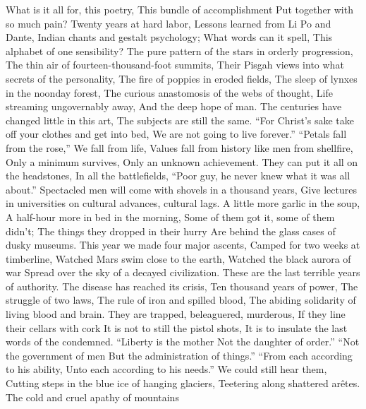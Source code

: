 \begin{poem}
    What is it all for, this poetry, 
    This bundle of accomplishment 
    Put together with so much pain? 
    Twenty years at hard labor, 
    Lessons learned from Li Po and Dante, 
    Indian chants and gestalt psychology; 
    What words can it spell, 
    This alphabet of one sensibility? 
    The pure pattern of the stars in orderly progression, 
    The thin air of fourteen-thousand-foot summits, 
    Their Pisgah views into what secrets of the personality, 
    The fire of poppies in eroded fields, 
    The sleep of lynxes in the noonday forest, 
    The curious anastomosis of the webs of thought, 
    Life streaming ungovernably away, 
    And the deep hope of man. 
    The centuries have changed little in this art, 
    The subjects are still the same. 
    ``For Christ's sake take off your clothes and get into bed, 
    We are not going to live forever.'' 
    ``Petals fall from the rose,'' 
    We fall from life, 
    Values fall from history like men from shellfire, 
    Only a minimum survives, 
    Only an unknown achievement. 
    They can put it all on the headstones, 
    In all the battlefields, 
    ``Poor guy, he never knew what it was all about.'' 
    Spectacled men will come with shovels in a thousand years, 
    Give lectures in universities on cultural advances, cultural lags. 
    A little more garlic in the soup, 
    A half-hour more in bed in the morning, 
    Some of them got it, some of them didn't; 
    The things they dropped in their hurry 
    Are behind the glass cases of dusky museums. 
    This year we made four major ascents, 
    Camped for two weeks at timberline, 
    Watched Mars swim close to the earth, 
    Watched the black aurora of war 
    Spread over the sky of a decayed civilization. 
    These are the last terrible years of authority. 
    The disease has reached its crisis, 
    Ten thousand years of power, 
    The struggle of two laws, 
    The rule of iron and spilled blood, 
    The abiding solidarity of living blood and brain. 
    They are trapped, beleaguered, murderous, 
    If they line their cellars with cork 
    It is not to still the pistol shots, 
    It is to insulate the last words of the condemned. 
    ``Liberty is the mother 
    Not the daughter of order.'' 
    ``Not the government of men 
    But the administration of things.'' 
    ``From each according to his ability, 
    Unto each according to his needs.'' 
    We could still hear them, 
    Cutting steps in the blue ice of hanging glaciers, 
    Teetering along shattered ar\^etes. 
    The cold and cruel apathy of mountains 

\end{poem}
